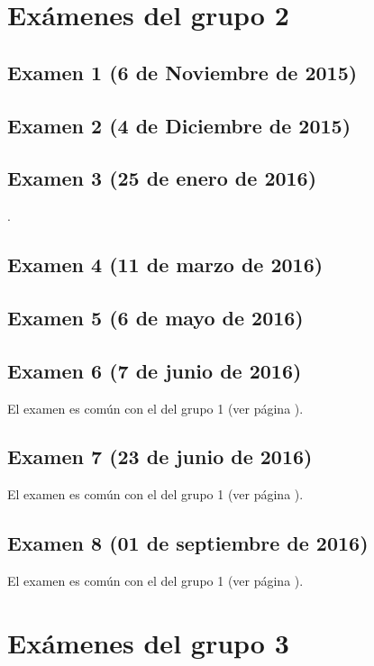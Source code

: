 \documentclass[a4paper,12pt,twoside]{book}
\begin{document}
\chapter{Exámenes del grupo 2}
\section{Examen 1 (6 de Noviembre de 2015)}
\section{Examen 2 (4 de Diciembre de 2015)}
\section{Examen 3 (25 de enero de 2016)}
 \label{examen_15_16_2_3}.
\section{Examen 4 (11 de marzo de 2016)}
\section{Examen 5 (6 de mayo de 2016)}
\section{Examen 6 (7 de junio de 2016)} 
El examen es común con el del grupo 1 (ver página \pageref{examen_15_16_1_6}).
\section{Examen 7 (23 de junio de 2016)}
El examen es común con el del grupo 1 (ver página \pageref{examen_15_16_1_7}).
\section{Examen 8 (01 de septiembre de 2016)}
El examen es común con el del grupo 1 (ver página \pageref{examen_15_16_1_8}).

\chapter{Exámenes del grupo 3}
\end{document}

